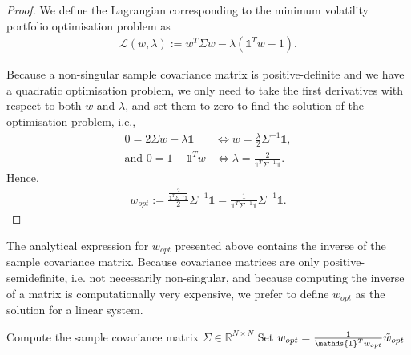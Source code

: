     \begin{proof}
        We define the Lagrangian corresponding to the minimum volatility portfolio optimisation problem as
        \begin{align*}
            \mathcal{L}(w, \lambda) := w^T \Sigma w - \lambda (\mathds{1}^T w - 1).
        \end{align*}
        
        Because a non-singular sample covariance matrix is positive-definite and we have a quadratic optimisation problem, we only need to take the first derivatives with respect to both $w$ and $\lambda$, and set them to zero to find the solution of the optimisation problem, i.e.,
        \begin{align*}
            0 = 2 \Sigma w - \lambda \mathds{1} &\Leftrightarrow w = \frac{\lambda}{2} \Sigma^{-1} \mathds{1}, \\
            \text{and } 0 = 1 - \mathds{1}^T w &\Leftrightarrow \lambda = \frac{2}{\mathds{1}^T \Sigma^{-1} \mathds{1}}.
        \end{align*}
        Hence,
        \begin{align*}
            w_{opt} := \frac{\frac{2}{\mathds{1}^T \Sigma^{-1} \mathds{1}}}{2} \Sigma^{-1} \mathds{1} = \frac{1}{\mathds{1}^T \Sigma^{-1} \mathds{1}} \Sigma^{-1} \mathds{1}.
        \end{align*}
    \end{proof}
    
    The analytical expression for $w_{opt}$ presented above contains the inverse of the sample covariance matrix. Because covariance matrices are only positive-semidefinite, i.e. not necessarily non-singular, and because computing the inverse of a matrix is computationally very expensive, we prefer to define $w_{opt}$ as the solution for a linear system.
    
    \begin{algorithm}[H]\label{algorithm:MMVP}
        \SetAlgoLined
        Compute the sample covariance matrix $\Sigma \in \mathbb{R}^{N \times N}$\;
        Set $w_{opt} = \frac{1}{\mathds{1}^T \Tilde{w}_{opt}} \Tilde{w}_{opt}$\;
        \caption{Markowitz Minimum Variance Portfolio Computation}
    \end{algorithm}
    
